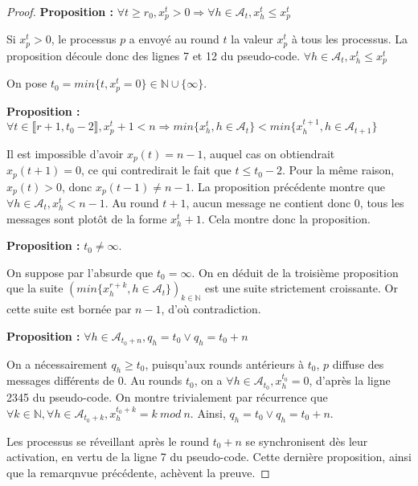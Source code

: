 \documentclass{article}
\begin{document}
\begin{proof}
	\textbf{Proposition :} $\forall t \geq r_0 , x_p^t > 0 \Rightarrow \forall h \in \mathcal{A}_t, x_h^t \leq x_p^t$

	Si $x_p^t > 0 $, le processus $p$ a envoyé au round $t$ la valeur $x_p^t$ à tous les processus. La proposition découle donc des lignes 7 et 12 du pseudo-code.
	$\forall h \in \mathcal{A}_t, x_h^t \leq x_p^t$

	On pose $t_0 = min \{t, x_p^t = 0\} \in \mathds{N} \cup \{\infty\}$.

	\textbf{Proposition :} $\forall t \in \llbracket r+1,  t_0-2 \rrbracket, x_p^t + 1 < n \Rightarrow min \{x_h^t, h \in \mathcal{A}_t\} < min \{x_h^{t+1}, h \in \mathcal{A}_{t+1}\}$

	Il est impossible d'avoir $x_p(t) = n-1$, auquel cas on obtiendrait $x_p(t+1) = 0$, ce qui contredirait le fait que $t \leq t_0 - 2$.
	Pour la même raison, $x_p(t) > 0$, donc $x_p(t-1) \neq n - 1$.
	 La proposition précédente montre que $\forall h \in \mathcal{A}_t, x_h^t < n - 1$.
	Au round $t+1$, aucun message ne contient donc $0$, tous les messages sont plotôt de la forme $x_h^t+1$.
	Cela montre donc la proposition.

	\textbf{Proposition :} $t_0 \neq \infty$.

	On suppose par l'absurde que $t_0 = \infty$. On en déduit de la troisième proposition que la suite $(min \{x_h^{r+k}, h \in \mathcal{A}_t\})_{k \in \mathds{N}}$ est une suite strictement croissante.
	Or cette suite est bornée par $n-1$, d'où contradiction.

	\textbf{Proposition :} $\forall h \in \mathcal{A}_{t_0+n}, q_h = t_0 \vee q_h = t_0 + n$

	On a nécessairement $q_h \geq t_0$, puisqu'aux rounds antérieurs à $t_0$, $p$ diffuse des messages différents de 0.
	Au rounds $t_0$, on a $\forall h \in \mathcal{A}_{t_0}, x_h^{t_0} = 0$, d'après la ligne 2345 du pseudo-code.
	On montre trivialement par récurrence que $\forall k \in \mathds{N}, \forall h \in \mathcal{A}_{t_0+k}, x_h^{t_0+k} = k~mod~n$.
	Ainsi, $q_h = t_0 \vee q_h = t_0 + n$.

	Les processus se réveillant après le round $t_0+n$ se synchronisent dès leur activation, en vertu de la ligne 7 du pseudo-code.
	Cette dernière proposition, ainsi que la remarqnvue précédente, achèvent la preuve.

\end{proof}
\end{document}
